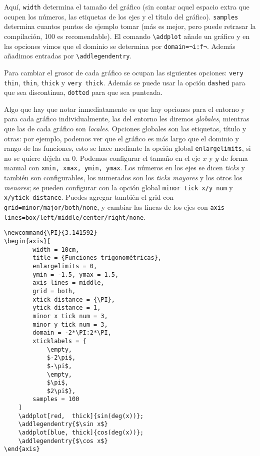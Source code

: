 \documentclass[intro-breve-latex.tex]{subfiles}
\begin{document}
Aquí, \texttt{width} determina el tamaño del gráfico (sin contar aquel espacio extra que ocupen los números, las etiquetas de los ejes y el título del gráfico). \texttt{samples} determina cuantos puntos de ejemplo tomar (más es mejor, pero puede retrasar la compilación, 100 es recomendable). El comando \lstinline|\addplot| añade un gráfico y en las opciones vimos que el dominio se determina por \lstinline|domain=¬i:f¬|. Además añadimos entradas por \lstinline|\addlegendentry|.

Para cambiar el grosor de cada gráfico se ocupan las siguientes opciones: \texttt{very thin}, \texttt{thin}, \texttt{thick} y \texttt{very thick}. Además se puede usar la opción \texttt{dashed} para que sea discontinua, \texttt{dotted} para que sea punteada. 

Algo que hay que notar inmediatamente es que hay opciones para el entorno y para cada gráfico individualmente, las del entorno les diremos \textit{globales}, mientras que las de cada gráfico son \textit{locales}. Opciones globales son las etiquetas, título y otras: por ejemplo, podemos ver que el gráfico es más largo que el dominio y rango de las funciones, esto se hace mediante la opción global \texttt{enlargelimits}, si no se quiere déjela en 0. Podemos configurar el tamaño en el eje $x$ y $y$ de forma manual con \texttt{xmin, xmax, ymin, ymax}. Los números en los ejes se dicen \textit{ticks} y también son configurables, los numerados son los \textit{ticks mayores} y los otros los \textit{menores}; se pueden configurar con la opción global \texttt{minor tick x/y num} y \texttt{x/ytick distance}. Puedes agregar también el grid con \texttt{grid=minor/major/both/none}, y cambiar las líneas de los ejes con \texttt{axis lines=box/left/middle/center/right/none}.
\begin{lstlisting}[basicstyle=\footnotesize\ttfamily]
\newcommand{\PI}{3.141592}
\begin{axis}[
		width = 10cm,
		title = {Funciones trigonométricas},
		enlargelimits = 0,
		ymin = -1.5, ymax = 1.5,
		axis lines = middle,
		grid = both,
		xtick distance = {\PI},
		ytick distance = 1,
		minor x tick num = 3,
		minor y tick num = 3,
		domain = -2*\PI:2*\PI,
		xticklabels = {
			\empty,
			$-2\pi$,
			$-\pi$,
			\empty,
			$\pi$,
			$2\pi$},
		samples = 100
	]
	\addplot[red,  thick]{sin(deg(x))};
	\addlegendentry{$\sin x$}
	\addplot[blue, thick]{cos(deg(x))};
	\addlegendentry{$\cos x$}
\end{axis}
\end{lstlisting}
\end{document}

